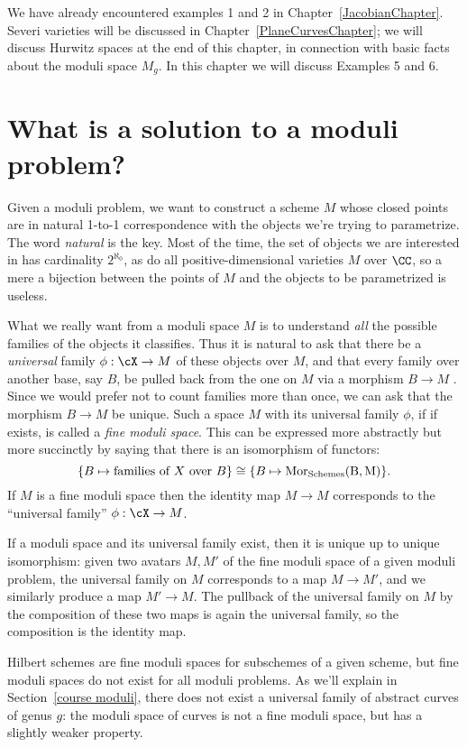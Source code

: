 We have already encountered examples 1 and 2 in Chapter~\ref{JacobianChapter}. Severi varieties will be discussed in Chapter~\ref{PlaneCurvesChapter}; we will discuss Hurwitz spaces at the end of this chapter, in connection with basic facts about the moduli space $M_g$. In this chapter we will discuss Examples 5 and 6.



\section{What is a solution to a moduli problem?}

Given a moduli problem, we want to construct a scheme $M$ whose closed points are in natural  1-to-1 correspondence with the objects we're trying to parametrize. The word \emph{natural} is the key. Most of the time, the set of objects we are interested in has cardinality $2^{\aleph_0}$, as do all positive-dimensional varieties $M$ over $\CC$, so a mere a bijection between the points of $M$ and the objects to be parametrized is useless.

What we really want from a moduli space $M$ is to understand \emph{all} the possible families of the objects it classifies. Thus it is natural to ask that there be a \emph{universal} family $\phi: \cX\to M$ of these objects over $M$,
and that every family over another base, say $B$,  be pulled back from the one on $M$ via a morphism $B\to M$ . Since we would prefer not to count families more than once, we can ask that the 
morphism $B\to M$ be unique. Such a space $M$ with its universal family $\phi$, if if exists, is called a \emph{fine moduli space}. This can be expressed more abstractly but more succinctly by saying that there is an isomorphism of functors:
$$
\{ B \mapsto \text{families of } X \text{ over } B \} \cong \{ B\mapsto \rm{Mor}_{\rm Schemes}(B, M) \}.
$$
If $M$ is a fine moduli space then the identity map $M\to M$ corresponds to the ``universal family'' $\phi: \cX \to M$. 

If a moduli space and its universal family exist, then it is unique up to unique isomorphism: given two avatars $M,M'$ of the fine moduli space of a given moduli problem,
the universal family on $M$ corresponds to a map $M\to M'$, and we similarly produce a map $M'\to M$. The pullback of the universal family on $M$ by the composition of these two maps is again the universal family, so the composition is the identity map.

Hilbert schemes are fine moduli spaces for subschemes of a given scheme, but 
fine moduli spaces do not exist for all moduli problems. As we'll explain in Section~\ref{course moduli}, there does not exist a universal family of abstract curves of genus $g$: the moduli space of curves is
not a fine moduli space, but has a slightly weaker property.


